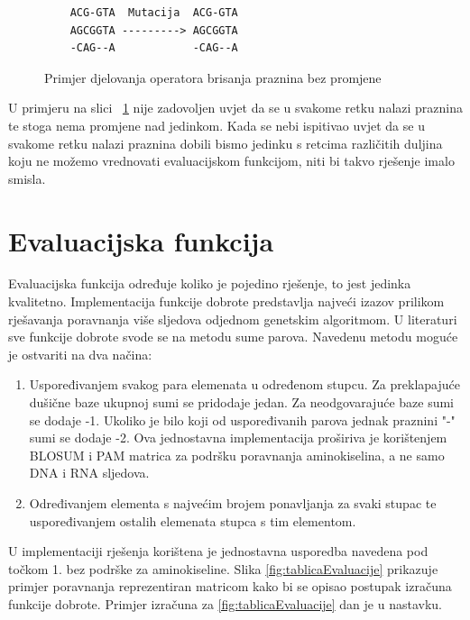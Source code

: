 \documentclass[times, utf8, zavrsni, numeric]{fer}
\begin{document}
  \begin{figure} [httb]
  	\begin{verbatim}
  	ACG-GTA  Mutacija  ACG-GTA
  	AGCGGTA ---------> AGCGGTA
  	-CAG--A            -CAG--A
  	\end{verbatim}
  	\caption{Primjer djelovanja operatora brisanja praznina bez promjene}
  	\label{fig:brisanje2}
  \end{figure}

U primjeru na slici ~\ref{fig:brisanje2} nije zadovoljen uvjet da se u svakome retku nalazi praznina te stoga nema promjene nad jedinkom. Kada se nebi ispitivao uvjet da se u svakome retku nalazi praznina dobili bismo jedinku s retcima različitih duljina koju ne možemo vrednovati evaluacijskom funkcijom, niti bi takvo rješenje imalo smisla.
  
  
  \section{Evaluacijska funkcija}
  
  Evaluacijska funkcija određuje koliko je pojedino rješenje, to jest jedinka kvalitetno. Implementacija funkcije dobrote predstavlja najveći izazov prilikom rješavanja poravnanja više sljedova odjednom genetskim algoritmom. U literaturi sve funkcije dobrote svode se na metodu sume parova.
  Navedenu metodu moguće je ostvariti na dva načina:
  \begin{enumerate}
  	\item Uspoređivanjem svakog para elemenata u određenom stupcu. Za preklapajuće dušične baze ukupnoj sumi se pridodaje jedan. Za neodgovarajuće baze sumi se dodaje -1. Ukoliko je bilo koji od uspoređivanih parova jednak praznini "-" sumi se dodaje -2. Ova jednostavna implementacija proširiva je korištenjem BLOSUM i PAM matrica za podršku poravnanja aminokiselina, a ne samo DNA i RNA sljedova.
  	\item Određivanjem elementa s najvećim brojem ponavljanja za svaki stupac te uspoređivanjem ostalih elemenata stupca s tim elementom.
  \end{enumerate}

 U implementaciji rješenja korištena je jednostavna usporedba navedena pod točkom 1. bez podrške za aminokiseline. Slika \ref{fig:tablicaEvaluacije} prikazuje primjer poravnanja reprezentiran matricom kako bi se opisao postupak izračuna funkcije dobrote. Primjer izračuna za \ref{fig:tablicaEvaluacije} dan je u nastavku.
\end{document}
